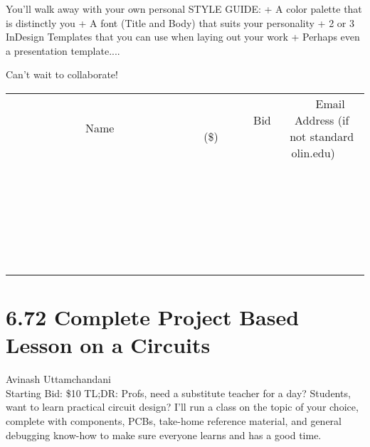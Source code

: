 \documentclass[11pt]{article}
\begin{document}
You'll walk away with your own personal STYLE GUIDE:
+ A color palette that is distinctly you
+ A font (Title and Body) that suits your personality
+ 2 or 3 InDesign Templates that you can use when laying out your work
+ Perhaps even a presentation template....

Can't wait to collaborate!
\\[6ex]
\begin{tabular}{c c c}
~~~~~~~~~~~~~Name~~~~~~~~~~~~~ & ~~~~~~~~~Bid (\$)~~~~~~~~~  & ~~~Email Address (if not standard olin.edu)~~~\\
 & & \\
\hline
 & & \\
\hline
 & & \\
\hline
 & & \\
\hline
 & & \\
\hline
 & & \\
\hline
 & & \\
\hline
 & & \\
\hline
 & & \\
\hline
 & & \\
\hline
 & & \\
\hline
 & & \\
\hline
 & & \\
\hline
 & & \\
\hline
 & & \\
\hline
 & & \\
\hline
 & & \\
\hline
 & & \\
\hline
 & & \\
\hline
 & & \\
\hline
 & & \\
\hline
 & & \\
\hline
 & & \\
\hline
 & & \\
\hline
 & & \\
\hline
 & & \\
\hline
\end{tabular}
\newpage
\section*{6.72 Complete Project Based Lesson on a Circuits}
Avinash Uttamchandani
\\
Starting Bid: \$10
\newline
TL;DR: Profs, need a substitute teacher for a day?  Students, want to learn practical circuit design?  I'll run a class on the topic of your choice, complete with components, PCBs, take-home reference material, and general debugging know-how to make sure everyone learns and has a good time.
\end{document}
